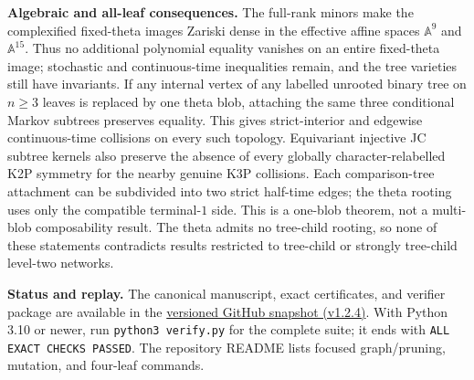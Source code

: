 \documentclass[10pt]{article}
\begin{document}
\textbf{Algebraic and all-leaf consequences.} The full-rank minors make the complexified fixed-theta images Zariski dense in the effective affine spaces $\mathbb A^9$ and $\mathbb A^{15}$. Thus no additional polynomial equality vanishes on an entire fixed-theta image; stochastic and continuous-time inequalities remain, and the tree varieties still have invariants. If any internal vertex of any labelled unrooted binary tree on $n\ge3$ leaves is replaced by one theta blob, attaching the same three conditional Markov subtrees preserves equality. This gives strict-interior and edgewise continuous-time collisions on every such topology. Equivariant injective JC subtree kernels also preserve the absence of every globally character-relabelled K2P symmetry for the nearby genuine K3P collisions. Each comparison-tree attachment can be subdivided into two strict half-time edges; the theta rooting uses only the compatible terminal-$1$ side. This is a one-blob theorem, not a multi-blob composability result. The theta admits no tree-child rooting, so none of these statements contradicts results restricted to tree-child or strongly tree-child level-two networks.

\textbf{Status and replay.} The canonical manuscript, exact certificates, and verifier package are available in the \href{https://github.com/AlecKriebel/Math/tree/k2p-k3p-theta-v1.2.4/k2p_k3p_theta_trinet_collision/k2p_k3p_theta_clarified}{versioned GitHub snapshot (v1.2.4)}. With Python 3.10 or newer, run \texttt{python3 verify.py} for the complete suite; it ends with \texttt{ALL EXACT CHECKS PASSED}. The repository README lists focused graph/pruning, mutation, and four-leaf commands.
\end{document}
